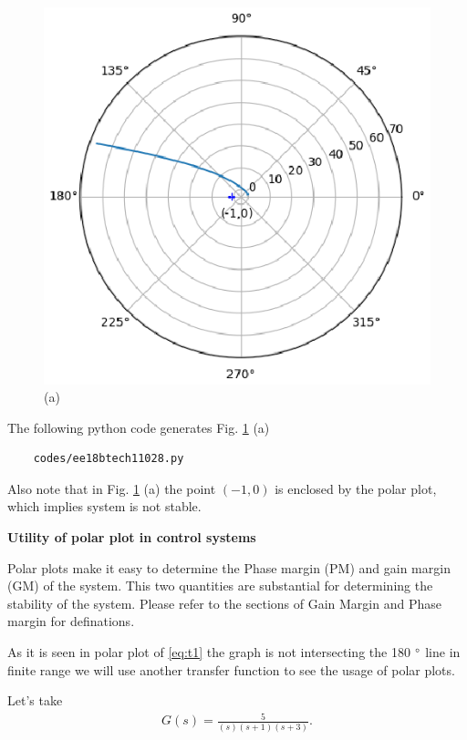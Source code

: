 \begin{enumerate}[label=\thesection.\arabic*.,ref=\thesection.\theenumi]
\begin{figure}[!h]
    \includegraphics[width=\columnwidth]{./figs/ee18btech11028/polar_plot2.eps}
  \caption{(a)}
  \label{fig:polarplot2}
\end{figure}

The following python code generates  Fig. \ref{fig:polarplot2} (a)
\begin{lstlisting}
    codes/ee18btech11028.py
\end{lstlisting}

Also note that in Fig. \ref{fig:polarplot2} (a) the point $(-1,0)$ is enclosed by the polar plot,
which implies system is not stable.

\textbf{Utility of polar plot in control systems}

Polar plots make it easy to determine the Phase margin (PM) and gain margin (GM) of the system.
This two quantities are substantial for determining the stability of the system.
Please refer to the sections of Gain Margin and Phase margin for definations.

As it is seen in polar plot of \eqref{eq:t1} the graph is not intersecting the 180 $\degree$ line in finite range we will use another transfer function to see the usage of polar plots.

Let's take
\begin{align}
    G(s) = \frac{5}{(s)(s+1)(s+3)}.
    \label{eq:t2} 
\end{align}


\end{enumerate}
